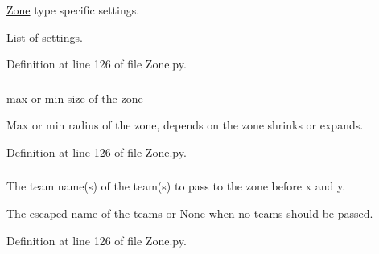 \hyperlink{class_zone_1_1_zone}{\-Zone} type specific settings. 

\-List of settings. 

\-Definition at line 126 of file \-Zone.\-py.

\hypertarget{class_zone_1_1_zone_a8cae307a50884aa846a8986e9cc9cca6}{
\subsubsection[{target\-\_\-size}]{}}
\label{class_zone_1_1_zone_a8cae307a50884aa846a8986e9cc9cca6}


max or min size of the zone 

\-Max or min radius of the zone, depends on the zone shrinks or expands. 

\-Definition at line 126 of file \-Zone.\-py.

\hypertarget{class_zone_1_1_zone_afcd2a65c9302b856a12d532f868e8cab}{
\subsubsection[{teamnames}]{}}
\label{class_zone_1_1_zone_afcd2a65c9302b856a12d532f868e8cab}


\-The team name(s) of the team(s) to pass to the zone before x and y. 

\-The escaped name of the teams or \-None when no teams should be passed. 

\-Definition at line 126 of file \-Zone.\-py.

\hypertarget{class_zone_1_1_zone_ad8b6fa4a5f156693f861269f4254eb45}{
\subsubsection[{teleport\-\_\-settings}]{}}
\label{class_zone_1_1_zone_ad8b6fa4a5f156693f861269f4254eb45}


